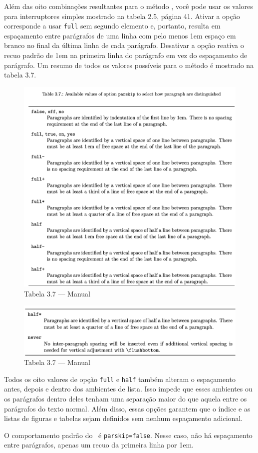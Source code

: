 Além das oito combinações resultantes para o método , você pode usar os valores para interruptores simples mostrado na tabela 2.5, página 41. Ativar a opção corresponde a usar \texttt{full} sem segundo elemento e, portanto, resulta em espaçamento entre parágrafos de uma linha com pelo menos 1em espaço em branco no final da última linha de cada parágrafo. Desativar a opção reativa o recuo padrão de 1em na primeira linha do parágrafo em vez do espaçamento de parágrafo. Um resumo de todos os valores possíveis para o método é mostrado na tabela 3.7.

\begin{figure}[h]
    \centering
    \includegraphics[width=0.9\linewidth]{imagens/tab3_7.png}
    \caption{Tabela 3.7 --- Manual}
    \label{fig:tab3_7}
\end{figure}

\begin{figure}[t!]
    \centering
    \includegraphics[width=0.8\linewidth]{imagens/tab3_7b.png}
    \caption{Tabela 3.7 --- Manual}
    \label{fig:tab3_7b}
\end{figure}

Todos os oito valores de opção \texttt{full} e \texttt{half} também alteram o espaçamento antes, depois e dentro dos ambientes de lista. Isso impede que esses ambientes ou os parágrafos dentro deles tenham uma separação maior do que aquela entre os parágrafos do texto normal. Além disso, essas opções garantem que o índice e as listas de figuras e tabelas sejam definidos sem nenhum espaçamento adicional.

O comportamento padrão do \KOMAScript\ é \texttt{parskip=false}. Nesse caso, não há espaçamento entre parágrafos, apenas um recuo da primeira linha por 1em.
